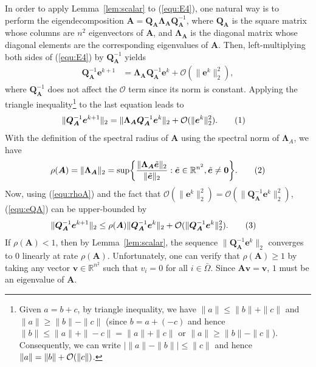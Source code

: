 \documentclass{article}
\def\R{{\mathbb R}}
\newcommand{\hlnew}[1]{{#1}}
\newcommand{\norm}[1]{\|#1\|} %
\newcommand\numberthis{\addtocounter{equation}{1}\tag{\theequation}}
\begin{document}
\noindent In order to apply Lemma~\ref{lem:scalar} to (\ref{equ:E4}), one natural way is to perform the eigendecomposition $\bm A = \bm Q_{\bm A} \bm \Lambda_{\bm A} \bm Q_{\bm A}^{-1}$, where $\bm Q_{\bm A}$ is the square matrix whose columns are $n^2$ eigenvectors of $\bm A$, and $\bm \Lambda_{\bm A}$ is the diagonal matrix whose diagonal elements are the corresponding eigenvalues of $\bm A$. Then, left-multiplying both sides of (\ref{equ:E4}) by $\bm Q_{\bm A}^{-1}$ yields
\begin{align*}
    \bm Q_{\bm A}^{-1} \bm e^{k+1} & = \bm \Lambda_{\bm A} \bm Q_{\bm A}^{-1} \bm e^k + \bm{\mathcal{O}}(\norm{\bm e^k}_2^2) ,
\end{align*}
\hlnew{where $\bm Q_{\bm A}^{-1}$ does not affect the $\bm{\mathcal{O}}$ term since its norm is constant.}
Applying the triangle inequality\footnote{Given $a=b+c$, by triangle inequality, we have $\|a\| \le \|b\| + \|c\|$ and $\|a\| \ge \|b\| -\|c\|$ (since $b=a+(-c)$ and hence $\|b\| \le \|a\| + \|-c\| = \|a\|+\|c\|$ or $\|a\| \ge \|b\|-\|c\|$). Consequently, we can write $|\|a\| -\|b\|| \le \|c\|$ and hence $\|a\| = \|b\| + {\cal O}(\|c\|)$.} to the last equation leads to 
\begin{align*}
    \norm{\bm Q_{\bm A}^{-1} \bm e^{k+1}}_2 & = \norm{\bm \Lambda_{\bm A} \bm Q_{\bm A}^{-1} \bm e^k}_2 + \mathcal{O}(\norm{\bm e^k}_2^2) . \numberthis \label{equ:eQA}
\end{align*}
With the definition of the spectral radius of $\bm A$ using the spectral norm of $\bm \Lambda_A$, we have
\begin{align*}
    \rho(\bm A) = \norm{\bm \Lambda_{\bm A}}_2 = \sup \biggl\{ \frac{\norm{\bm \Lambda_{\bm A} \tilde{\bm e}}_2}{\norm{\tilde{\bm e}}_2} : \tilde{\bm e} \in \R^{n^2}, \tilde{\bm e} \neq \bm 0 \biggr\} . \numberthis \label{equ:rhoA}
\end{align*}
Now, using (\ref{equ:rhoA}) and the fact that $\mathcal{O}(\norm{\bm e^k}_2^2) = \mathcal{O}(\norm{\bm Q_{\bm A}^{-1} \bm e^k}_2^2)$, (\ref{equ:eQA}) can be upper-bounded by
\begin{align*}
    \norm{\bm Q_{\bm A}^{-1} \bm e^{k+1}}_2 & \leq \rho(\bm A) \norm{\bm Q_{\bm A}^{-1} \bm e^k}_2 + \mathcal{O}(\norm{\bm Q_{\bm A}^{-1} \bm e^k}_2^2) . \numberthis \label{equ:boundA}
\end{align*}
If $\rho(\bm A) < 1$, then by Lemma~\ref{lem:scalar}, the sequence $\norm{\bm Q_{\bm A}^{-1} \bm e^k}_2$ converges to $0$ linearly at rate $\rho(\bm A)$. Unfortunately, one can verify that $\rho(\bm A) \geq 1$ by taking any vector $\bm v \in \R^{n^2}$ such that $v_i=0$ for all $i \in \bar{\Omega}$. Since $\bm A \bm v = \bm v$, $1$ must be an eigenvalue of $\bm A$. 
\end{document}
